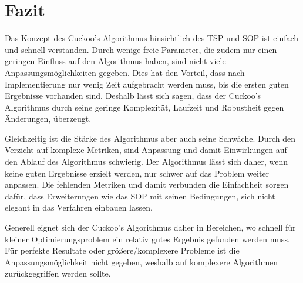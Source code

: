 \documentclass[conference]{IEEEtran}
\begin{document}
  \section{Fazit}
    Das Konzept des Cuckoo's Algorithmus hinsichtlich des TSP und SOP ist einfach und schnell verstanden.
    Durch wenige freie Parameter, die zudem nur einen geringen Einfluss auf den Algorithmus haben, sind nicht viele Anpassungsmöglichkeiten gegeben. 
    Dies hat den Vorteil, dass nach Implementierung nur wenig Zeit aufgebracht werden muss, bis die ersten guten Ergebnisse vorhanden sind. 
    Deshalb lässt sich sagen, dass der Cuckoo's Algorithmus durch seine geringe Komplexität,  
    Laufzeit und Robustheit gegen Änderungen, überzeugt. 

    Gleichzeitig ist die Stärke des Algorithmus aber auch seine Schwäche. Durch den Verzicht 
    auf komplexe Metriken, sind Anpassung und damit Einwirkungen auf den Ablauf des Algorithmus schwierig.
    Der Algorithmus lässt sich daher, wenn keine guten Ergebnisse erzielt werden, nur schwer auf das Problem weiter anpassen. 
    Die fehlenden Metriken und damit verbunden die Einfachheit sorgen dafür, dass Erweiterungen wie das SOP mit seinen Bedingungen, sich nicht elegant in das 
    Verfahren einbauen lassen.

    Generell eignet sich der Cuckoo's Algorithmus daher in Bereichen, wo schnell für kleiner Optimierungsproblem ein relativ 
    gutes Ergebnis gefunden werden muss. Für perfekte Resultate oder größere/komplexere Probleme ist die Anpassungsmöglichkeit 
    nicht gegeben, weshalb auf komplexere Algorithmen zurückgegriffen werden sollte.
\end{document}
